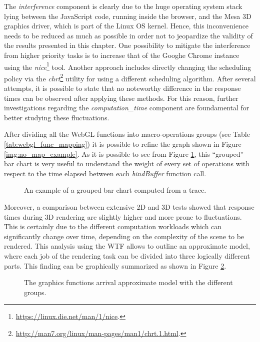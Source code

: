 The \emph{interference} component is clearly due to the huge operating system
stack lying between the JavaScript code, running inside the
browser, and the Mesa 3D graphics driver, which is part of the Linux OS kernel.
Hence, this inconvenience needs to be reduced as much as possible in order not
to jeopardize the validity of the results presented in this chapter.
One possibility to mitigate
the interference from higher priority tasks is to increase that of
the Googhe Chrome instance using the \emph{nice}\footnote{\url{https://linux.die.net/man/1/nice}.}
tool. Another approach includes directly changing the scheduling policy via the
\emph{chrt}\footnote{\url{http://man7.org/linux/man-pages/man1/chrt.1.html}.}
utility for using a different scheduling algorithm. After several attempts,
it is possible to state that no
noteworthy difference in the response times can be observed after applying these
methods. For this reason, further investigations regarding the \emph{computation\_time}
component are foundamental for better studying these fluctuations.

After dividing all the WebGL functions into macro-operations groups
(see Table \ref{tab:webgl_func_mapping}) it is possible to refine the graph shown
in Figure \ref{img:no_map_example}. As it is possible to see from Figure
\ref{img:no_map_groups}, this ``grouped'' bar chart is very useful to understand
the weight of every set of operations with respect to the time elapsed between
each \emph{bindBuffer} function call.
\begin{figure}[!htb]
    \caption{An example of a grouped bar chart computed from a trace.}
    \label{img:no_map_groups}
\end{figure}

Moreover, a comparison between extensive 2D and 3D tests showed that response times
during 3D rendering are slightly higher and more prone to fluctuations. This is
certainly due to the different computation workloads which can significantly change
over time, depending on the complexity of the scene to be rendered.
This analysis using the WTF allows to outline an approximate model, where
each job of the rendering task can be divided into three logically different
parts. This finding can be graphically summarized as shown in Figure \ref{img:call_arrival}.
\begin{figure}[!htb]
    \caption{The graphics functions arrival approximate model with the different groups.}
    \label{img:call_arrival}
\end{figure}

